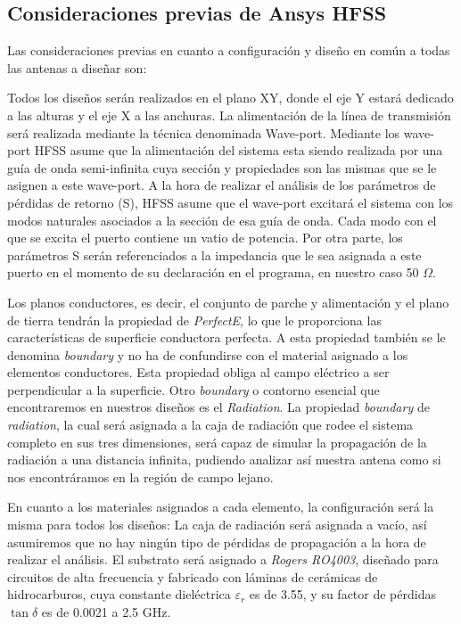 \subsection{Consideraciones previas de Ansys HFSS}

\par Las consideraciones previas en cuanto a configuración y diseño en común a todas las antenas a diseñar son:
\\
\par Todos los diseños serán realizados en el plano XY, donde el eje Y estará dedicado a las alturas y el eje X a las anchuras. La alimentación de la línea de transmisión será realizada mediante la técnica denominada Wave-port. Mediante los wave-port HFSS asume que la alimentación del sistema esta siendo realizada por una guía de onda semi-infinita cuya sección y propiedades son las mismas que se le asignen a este wave-port. A la hora de realizar el análisis de los parámetros de pérdidas de retorno (S), HFSS asume que el wave-port excitará el sistema con los modos naturales asociados a la sección de esa guía de onda. Cada modo con el que se excita el puerto contiene un vatio de potencia. Por otra parte, los parámetros S serán referenciados a la impedancia que le sea asignada a este puerto en el momento de su declaración en el programa, en nuestro caso 50 $\Omega$.
\\
\par Los planos conductores, es decir, el conjunto de parche y alimentación y el plano de tierra tendrán la propiedad de \textit{PerfectE}, lo que le proporciona las características de superficie conductora perfecta. A esta propiedad también se le denomina \textit{boundary} y no ha de confundirse con el material asignado a los elementos conductores. Esta propiedad obliga al campo eléctrico a ser perpendicular a la superficie. Otro \textit{boundary} o contorno esencial que encontraremos en nuestros diseños es el \textit{Radiation}. La propiedad \textit{boundary} de \textit{radiation}, la cual será asignada a la caja de radiación que rodee el sistema completo en sus tres dimensiones, será capaz de simular la propagación de la radiación a una distancia infinita, pudiendo analizar así nuestra antena como si nos encontráramos en la región de campo lejano.
\\
\par En cuanto a los materiales asignados a cada elemento, la configuración será la misma para todos los diseños: La caja de radiación será asignada a vacío, así asumiremos que no hay ningún tipo de pérdidas de propagación a la hora de realizar el análisis. El substrato será asignado a \textit{Rogers RO4003}, diseñado para circuitos de alta frecuencia y fabricado con láminas de cerámicas de hidrocarburos, cuya constante dieléctrica $\varepsilon_{r}$ es de 3.55, y su factor de pérdidas $\tan \delta$ es de 0.0021 a 2.5 GHz.
